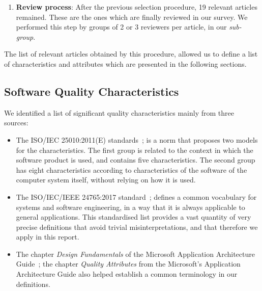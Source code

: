 \documentclass[a4paper]{article}
\begin{document}
\begin{enumerate}
    \item \textbf{Review process}: After the previous selection procedure, 19 relevant articles remained. These are the ones which are finally reviewed in our survey. We performed this step by groups of 2 or 3 reviewers per article, in our \textit{sub-group}.
\end{enumerate}

The list of relevant articles obtained by this procedure, allowed us to define a list of characteristics and attributes which are presented in the following sections.

\subsection{Software Quality Characteristics}
\label{subsect:sqchar}

We identified a list of significant quality characteristics mainly from three sources:

\begin{itemize}
    \item The ISO/IEC 25010:2011(E) standards~\cite{iso_25010_2011_2017}; is a norm that proposes two models for the characteristics. The first group is related to the context in which the software product is used, and contains five characteristics. The second group has eight characteristics according to characteristics of the software of the computer system itself, without relying on how it is used.

    \item The ISO/IEC/IEEE 24765:2017 standard~\cite{iso_iec_24765_2017}; defines a common vocabulary for systems and software engineering, in a way that it is always applicable to general applications. This standardised list provides a vast quantity of very precise definitions that avoid trivial misinterpretations, and that therefore we apply in this report.

    \item The chapter \textit{Design Fundamentals} of the Microsoft Application Architecture Guide~\cite{microsoft_2010}; the chapter \textit{Quality Attributes} from the Microsoft's Application Architecture Guide also helped establish a common terminology in our definitions.

\end{itemize}
\end{document}
